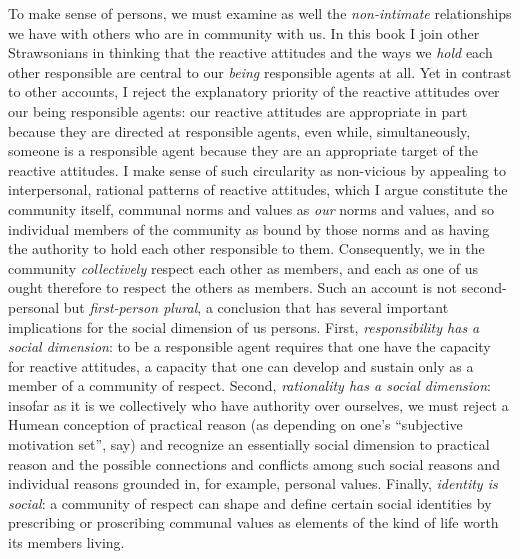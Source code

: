 \documentclass[11pt]{article}
\begin{document}
To make sense of persons, we must examine as well the \emph{non-intimate} relationships we have with others who are in community with us. In this book I join other Strawsonians in thinking that the reactive attitudes and the ways we \emph{hold} each other responsible are central to our \emph{being} responsible agents at all. Yet in contrast to other accounts, I reject the explanatory priority of the reactive attitudes over our being responsible agents: our reactive attitudes are appropriate in part because they are directed at responsible agents, even while, simultaneously, someone is a responsible agent because they are an appropriate target of the reactive attitudes. I make sense of such circularity as non-vicious by appealing to interpersonal, rational patterns of reactive attitudes, which I argue constitute the community itself, communal norms and values as \emph{our} norms and values, and so individual members of the community as bound by those norms and as having the authority to hold each other responsible to them. Consequently, we in the community \emph{collectively} respect each other as members, and each as one of us ought therefore to respect the others as members. Such an account is not second-personal but \emph{first-person plural}, a conclusion that has several important implications for the social dimension of us persons. First, \emph{responsibility has a social dimension}: to be a responsible agent requires that one have the capacity for reactive attitudes, a capacity that one can develop and sustain only as a member of a community of respect. Second, \emph{rationality has a social dimension}: insofar as it is we collectively who have authority over ourselves, we must reject a Humean conception of practical reason (as depending on one's \enquote{subjective motivation set}, say) and recognize an essentially social dimension to practical reason and the possible connections and conflicts among such social reasons and individual reasons grounded in, for example, personal values. Finally, \emph{identity is social}: a community of respect can shape and define certain social identities by prescribing or proscribing communal values as elements of the kind of life worth its members living.

\subsection*{}%
\end{document}
